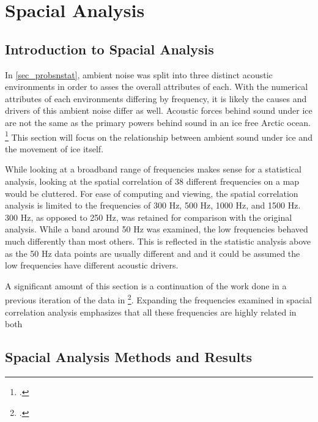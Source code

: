 
\chapter{Spacial Analysis}

\section{Introduction to Spacial Analysis}

In \autoref{sec_probsnstat}, ambient noise was split into three distinct acoustic environments in order to asses the overall attributes of each. With the numerical attributes of each environments differing by frequency, it is likely the causes and drivers of this ambient noise differ as well. Acoustic forces behind sound under ice are not the same as the primary powers behind sound in an ice free Arctic ocean. \footcite[]{icesound} This section will focus on the relationship between ambient sound under ice and the movement of ice itself.

While looking at a broadband range of frequencies makes sense for a statistical analysis, looking at the spatial correlation of 38 different frequencies on a map would be cluttered. For ease of computing and viewing, the spatial correlation analysis is limited to the frequencies of 300 Hz, 500 Hz, 1000 Hz, and 1500 Hz. 300 Hz, as opposed to 250 Hz, was retained for comparison with the original analysis. While a band around 50 Hz was examined, the low frequencies behaved much differently than most others. This is reflected in the statistic analysis above as the 50 Hz data points are usually different and and it could be assumed the low frequencies have different acoustic drivers. 

A significant amount of this section is a continuation of the work done in a previous iteration of the data in \footcite[]{BonnelMain}. Expanding the frequencies examined in spacial correlation analysis emphasizes that all these frequencies are highly related in both

\section{Spacial Analysis Methods and Results}


